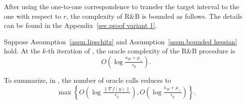 \documentclass{article}
\begin{document}
After using the one-to-one correspondence to transfer the target interval to the one with respect to $r$, the complexity of R\&B is bounded as follows. The details can be found in the Appendix~\ref{sec.proof variant 1}.
\begin{lemma}
    \label{lem.bound initial interval}
    Suppose Assumption~\ref{assm.lipschitz} and Assumption~\ref{assm.bounded hessian} hold. At the $k$-th iteration of , the oracle complexity of the R\&B procedure is
    \begin{equation}
        \label{eq.complexity bisection}
        O\left(\log\tfrac{\kappa_H+\mu_+}{\epsilon_g}\right).
    \end{equation}
\end{lemma}
To summarize, in , the number of oracle calls  reduces to
\begin{equation*}
    \max\left\{O\left(\log \tfrac{\|\nabla f(y)\|}{\epsilon_g}\right),
    O\left(\log\tfrac{\kappa_H+\mu_+}{\epsilon_g}\right)
    \right\}.
\end{equation*}
\end{document}
